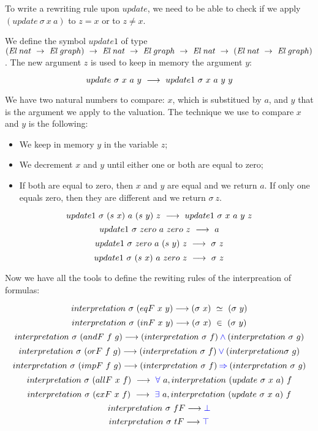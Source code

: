 \documentclass[a4paper]{article}
\begin{document}
To write a rewriting rule upon $update$, we need to be able to check if we apply $(update \ \sigma \ x \ a)$ to $z = x$ or to $z \neq x$.

We define the symbol $update1$ of type $(\El \ nat \ \ra \ \El~graph) \ \ra \ \El \ nat \ \ra \ \El~graph \ \ra \ \El \ nat \ \ra \ (\El \ nat \ \ra \ \El~graph)$. The new argument $z$ is used to keep in memory the argument $y$:

$$update \ \sigma \ x \ a \ y \ \lra \ update1 \ \sigma \ x \ a \ y \ y$$

We have two natural numbers to compare: $x$, which is substitued by $a$, and $y$ that is the argument we apply to the valuation. The technique we use to compare $x$ and $y$ is the following: 

\begin{itemize}
\item We keep in memory $y$ in the variable $z$;
\item We decrement $x$ and $y$ until either one or both are equal to zero;
\item If both are equal to zero, then $x$ and $y$ are equal and we return $a$. If only one equals zero, then they are different and we return $\sigma \ z$.
\end{itemize}

$$update1 \ \sigma \ (s \ x) \ a \ (s \ y) \ z \ \longrightarrow \ update1 \ \sigma \ x \ a \ y \ z$$
$$ update1 \ \sigma \ zero \ a \ zero \ z \ \lra \ a$$
$$update1 \ \sigma \ zero \ a \ (s \ y) \ z \ \longrightarrow \ \sigma \ z$$
$$update1 \ \sigma \ (s \ x) \ a \ zero \ z \ \longrightarrow \ \sigma \ z$$


Now we have all the tools to define the rewiting rules of the interpreation of formulas:

$$interpretation \ \sigma \ (eqF \ x \ y) \longrightarrow (\sigma \ x) \ \simeq \ (\sigma \ y)$$
$$interpretation \ \sigma \ (inF \ x \ y) \longrightarrow (\sigma \ x) \ \in \ (\sigma \ y)$$
$$interpretation \ \sigma \ (andF \ f \ g) \lra (interpretation \ \sigma \ f) \conj (interpretation \ \sigma \ g)$$
$$interpretation \ \sigma \ (orF \ f \ g) \longrightarrow (interpretation \ \sigma \ f) \mathbin{\color{blue} \vee}  (interpretation \sigma \ g)$$
$$interpretation \ \sigma \ (impF \ f \ g) \lra (interpretation \ \sigma \ f) \imp (interpretation \ \sigma \ g)$$
$$interpretation \ \sigma \ (allF \ x \ f) \ \lra \ \fa \ a, interpretation \ (update \ \sigma \ x \ a) \ f$$
$$interpretation \ \sigma \ (exF \ x \ f) \ \lra \ \ex \ a, interpretation \ (update \ \sigma \ x \ a) \ f$$
$$interpretation \ \sigma \ fF \longrightarrow {\color{blue} \bot}$$
$$interpretation \ \sigma \ tF \longrightarrow {\color{blue} \top}$$
\end{document}
